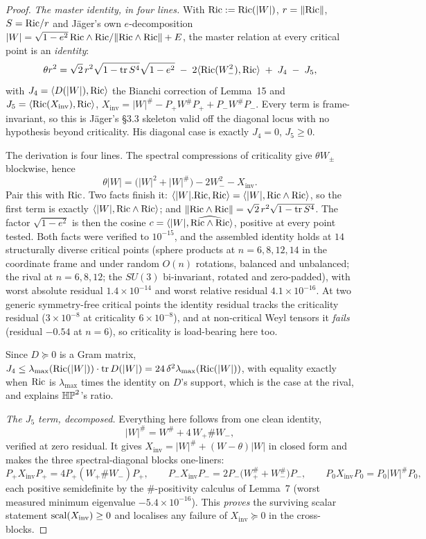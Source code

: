 \begin{proof}
\emph{The master identity, in four lines.} With $\mathrm{Ric}:=\mathrm{Ric}(|W|)$, $r=\|\mathrm{Ric}\|$, $S=\mathrm{Ric}/r$ and J\"ager's own $e$-decomposition $|W|=\sqrt{1-e^2}\,\mathrm{Ric}\wedge\mathrm{Ric}/\|\mathrm{Ric}\wedge\mathrm{Ric}\|+E$, the master relation at every critical point is an \emph{identity}:
\[
\theta r^2=\sqrt2\,r^2\sqrt{1-\operatorname{tr} S^4}\sqrt{1-e^2}\;-\;2\langle\mathrm{Ric}(W_-^2),\mathrm{Ric}\rangle\;+\;J_4\;-\;J_5 ,
\]
with $J_4=\langle D(|W|),\mathrm{Ric}\rangle$ the Bianchi correction of Lemma~15 and $J_5=\langle\mathrm{Ric}(X_{\mathrm{inv}}),\mathrm{Ric}\rangle$, $X_{\mathrm{inv}}=|W|^{\#}-P_+W^{\#}P_++P_-W^{\#}P_-$. Every term is frame-invariant, so this is J\"ager's \S3.3 skeleton valid off the diagonal locus with no hypothesis beyond criticality. His diagonal case is exactly $J_4=0$, $J_5\ge0$.

The derivation is four lines. The spectral compressions of criticality give $\theta W_\pm$ blockwise, hence
\[
\theta|W|=\big(|W|^2+|W|^{\#}\big)-2W_-^2-X_{\mathrm{inv}} .
\]
Pair this with $\mathrm{Ric}$. Two facts finish it: $\langle|W|.\mathrm{Ric},\mathrm{Ric}\rangle=\langle|W|,\mathrm{Ric}\wedge\mathrm{Ric}\rangle$, so the first term is exactly $\langle|W|,\mathrm{Ric}\wedge\mathrm{Ric}\rangle$; and $\|\mathrm{Ric}\wedge\mathrm{Ric}\|=\sqrt2\,r^2\sqrt{1-\operatorname{tr} S^4}$. The factor $\sqrt{1-e^2}$ is then the cosine $c=\langle|W|,\widehat{\mathrm{Ric}\wedge\mathrm{Ric}}\rangle$, positive at every point tested. Both facts were verified to $10^{-15}$, and the assembled identity holds at $14$ structurally diverse critical points (sphere products at $n=6,8,12,14$ in the coordinate frame and under random $O(n)$ rotations, balanced and unbalanced; the rival at $n=6,8,12$; the $SU(3)$ bi-invariant, rotated and zero-padded), with worst absolute residual $1.4\times10^{-14}$ and worst relative residual $4.1\times10^{-16}$. At two generic symmetry-free critical points the identity residual tracks the criticality residual ($3\times10^{-8}$ at criticality $6\times10^{-8}$), and at non-critical Weyl tensors it \emph{fails} (residual $-0.54$ at $n=6$), so criticality is load-bearing here too.

Since $D\succeq0$ is a Gram matrix, $J_4\le\lambda_{\max}(\mathrm{Ric}(|W|))\cdot\operatorname{tr} D(|W|)=24\,\delta^2\lambda_{\max}(\mathrm{Ric}(|W|))$, with equality exactly when $\mathrm{Ric}$ is $\lambda_{\max}$ times the identity on $D$'s support, which is the case at the rival, and explains $\mathbb{HP}^2$'s ratio.

\emph{The $J_5$ term, decomposed.} Everything here follows from one clean identity,
\[
|W|^{\#}=W^{\#}+4\,W_+\#W_- ,
\]
verified at zero residual. It gives $X_{\mathrm{inv}}=|W|^{\#}+(W-\theta)|W|$ in closed form and makes the three spectral-diagonal blocks one-liners:
\[
P_+X_{\mathrm{inv}}P_+=4P_+(W_+\#W_-)P_+,\qquad
P_-X_{\mathrm{inv}}P_-=2P_-\big(W_+^{\#}+W_-^{\#}\big)P_-,\qquad
P_0X_{\mathrm{inv}}P_0=P_0|W|^{\#}P_0 ,
\]
each positive semidefinite by the $\#$-positivity calculus of Lemma~7 (worst measured minimum eigenvalue $-5.4\times10^{-16}$). This \emph{proves} the surviving scalar statement $\mathrm{scal}(X_{\mathrm{inv}})\ge0$ and localises any failure of $X_{\mathrm{inv}}\succeq0$ in the cross-blocks.


\end{proof}
